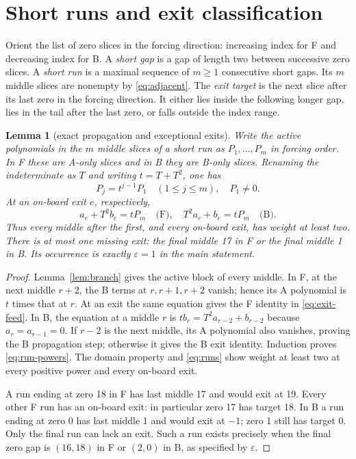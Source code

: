 \documentclass{article}
\newtheorem{lemma}{Lemma}
\begin{document}
\section{Short runs and exit classification}\label{sec:runs}

Orient the list of zero slices in the forcing direction: increasing index for F and decreasing
index for B. A \emph{short gap} is a gap of length two between successive zero slices. A
\emph{short run} is a maximal sequence of \(m \ge 1\) consecutive short gaps. Its \(m\) middle
slices are nonempty by \eqref{eq:adjacent}. The \emph{exit target} is the next slice after its
last zero in the forcing direction. It either lies inside the following longer gap, lies in the
tail after the last zero, or falls outside the index range.

\begin{lemma}[exact propagation and exceptional exits]\label{lem:propagation}
  Write the active polynomials in the \(m\) middle slices of a short run as
  \(P_1, \dots, P_m\) in forcing order. In F these are A-only slices and in B they are B-only
  slices. Renaming the indeterminate as \(T\) and writing \(t = T + T^2\), one has
  \begin{equation}\label{eq:run-powers}
    P_j = t^{j-1} P_1 \quad (1 \le j \le m), \quad P_1 \ne 0.
  \end{equation}
  At an on-board exit \(e\), respectively,
  \begin{equation}\label{eq:exit-feed}
    a_e + T^2 b_e = t P_m \quad \text{(F)}, \quad T^2 a_e + b_e = t P_m \quad \text{(B)}.
  \end{equation}
  Thus every middle after the first, and every on-board exit, has weight at least two. There is
  at most one missing exit: the final middle 17 in F or the final middle 1 in B. Its occurrence
  is exactly \(\varepsilon = 1\) in the main statement.
\end{lemma}

\begin{proof}
  Lemma~\ref{lem:branch} gives the active block of every middle. In F, at the next middle
  \(r + 2\), the B terms at \(r, r + 1, r + 2\) vanish; hence its A polynomial is \(t\) times
  that at \(r\). At an exit the same equation gives the F identity in \eqref{eq:exit-feed}. In B,
  the equation at a middle \(r\) is \(t b_r = T^2 a_{r-2} + b_{r-2}\) because
  \(a_r = a_{r-1} = 0\). If \(r - 2\) is the next middle, its A polynomial also vanishes, proving
  the B propagation step; otherwise it gives the B exit identity. Induction proves
  \eqref{eq:run-powers}. The domain property and \eqref{eq:runs} show weight at least two at
  every positive power and every on-board exit.

  A run ending at zero 18 in F has last middle 17 and would exit at 19. Every other F run has an
  on-board exit: in particular zero 17 has target 18. In B a run ending at zero 0 has last middle
  1 and would exit at \(-1\); zero 1 still has target 0. Only the final run can lack an exit.
  Such a run exists precisely when the final zero gap is \((16,18)\) in F or \((2,0)\) in B, as
  specified by \(\varepsilon\).
\end{proof}
\end{document}
